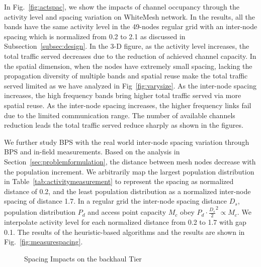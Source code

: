 In Fig.~\ref{fig:actspac}, we show the impacts of channel occupancy through 
the activity level and spacing variation on WhiteMesh network. 
In the results, all the bands have the same activity level in the 49-nodes regular 
grid with an inter-node spacing which is normalized from 
0.2 to 2.1 as discussed in Subsection~\ref{subsec:design}. In the 3-D figure, 
as the activity level increases, the total traffic served decreases due to the reduction 
of achieved channel capacity. In the spatial dimension, when the nodes have extremely
small spacing, lacking the propagation diversity of multiple bands and spatial reuse  make the total traffic served
limited as we have analyzed in Fig~\ref{fig:varysize}. 
As the inter-node spacing increases, the high frequency bands
bring higher total traffic served via more spatial reuse. 
As the inter-node spacing increases, the higher frequency links fail due to the limited 
communication range. The number of available channels reduction leads the total traffic served 
reduce sharply as shown in the figures.

We further study BPS with the real world inter-node spacing variation through BPS and in-field measurements.
Based on the analysis in Section~\ref{sec:problemformulation}, the distance between mesh nodes decrease 
with the population increment.
We arbitrarily map the largest population distribution in Table~\ref{tab:activitymeasurement} to 
represent the spacing as normalized distance of 0.2, and the least population distribution 
as a normalized inter-node spacing of distance 1.7. In a regular grid the inter-node spacing distance $D_s$, population 
distribution $P_d$ and access point capacity $M_c$ obey $P_d \cdot \frac{D_s}{2} ^2 \propto M_c$. 
We interpolate activity level for each normalized distance from 0.2 to 1.7 with gap 0.1. 
The results of the heuristic-based algorithms and the results are shown in Fig.~\ref{fig:measurespacing}.

\begin{figure}[t]
\centering
{}
\hfill
\caption{Spacing Impacts on the backhaul Tier}
\label{fig:all3figs}
\vspace{-0.3in}
\end{figure}

